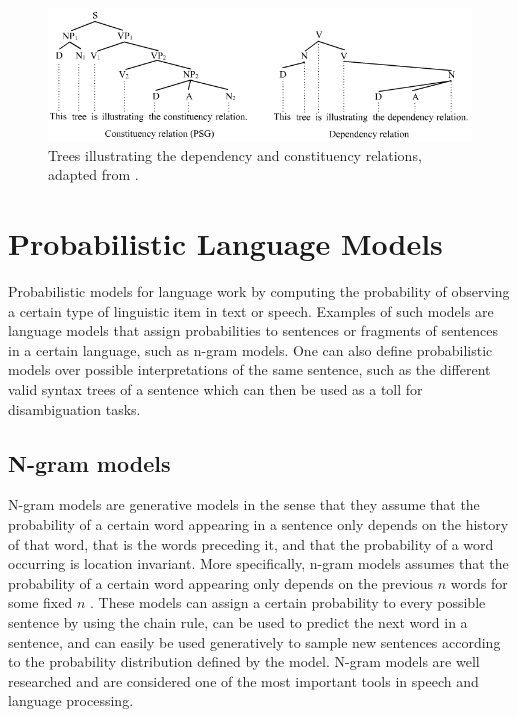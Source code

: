 \begin{figure}
\includegraphics[width=\linewidth]{figure/dependency_constituency.png} 
\caption{Trees illustrating the dependency and constituency relations, adapted from \citet{wikipedia2011trees}.}
\label{fig:depconst}
\end{figure}

\section{Probabilistic Language Models}
\label{sec:lm}

Probabilistic models for language work by computing the probability of observing a certain type of linguistic item in text or speech. Examples of such models are language models that assign probabilities to sentences or fragments of sentences in a certain language, such as n-gram models. One can also define probabilistic models over possible interpretations of the same sentence, such as the different valid syntax trees of a sentence which can then be used as a toll for disambiguation tasks.

\subsection{N-gram models}
N-gram models are generative models in the sense that they assume that the probability of a certain word appearing in a sentence only depends on the history of that word, that is the words preceding it, and that the probability of a word occurring is location invariant. More specifically, n-gram models assumes that the probability of a certain word appearing only depends on the previous $n$ words for some fixed $n$ \citep{jurafsky2009speech}. These models can assign a certain probability to every possible sentence by using the chain rule, can be used to predict the next word in a sentence, and can easily be used generatively to sample new sentences according to the probability distribution defined by the model. N-gram models are well researched and are considered one of the most important tools in speech and language processing.

